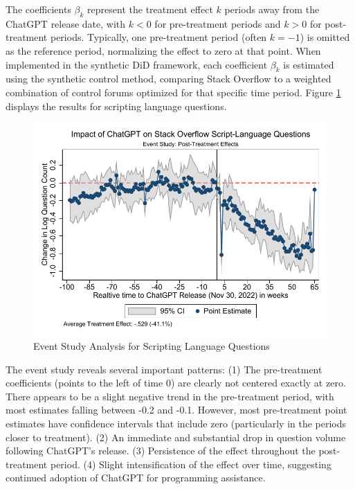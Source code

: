 The coefficients $\beta_k$ represent the treatment effect $k$ periods away from the ChatGPT release date, with $k < 0$ for pre-treatment periods and $k > 0$ for post-treatment periods. Typically, one pre-treatment period (often $k = -1$) is omitted as the reference period, normalizing the effect to zero at that point. When implemented in the synthetic DiD framework, each coefficient $\beta_k$ is estimated using the synthetic control method, comparing Stack Overflow to a weighted combination of control forums optimized for that specific time period. Figure \ref{fig:event_study} displays the results for scripting language questions.

\begin{figure}[H]
    \centering
    \includegraphics[width=1\textwidth]{imgs/stata/event_study_scripting_languages.pdf}
    \caption{Event Study Analysis for Scripting Language Questions}
    \label{fig:event_study}
\end{figure}

The event study reveals several important patterns: (1) The pre-treatment coefficients (points to the left of time 0) are clearly not centered exactly at zero. There appears to be a slight negative trend in the pre-treatment period, with most estimates falling between -0.2 and -0.1. However, most pre-treatment point estimates have confidence intervals that include zero (particularly in the periods closer to treatment). (2) An immediate and substantial drop in question volume following ChatGPT's release. (3) Persistence of the effect throughout the post-treatment period. (4) Slight intensification of the effect over time, suggesting continued adoption of ChatGPT for programming assistance.

